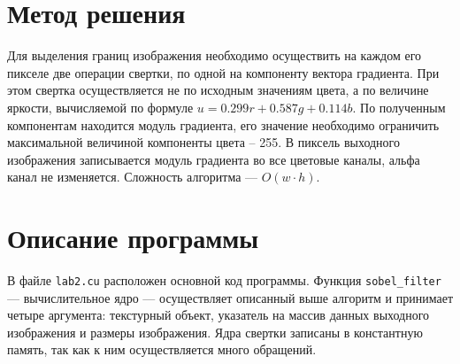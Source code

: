 \section{Метод решения}
Для выделения границ изображения необходимо осуществить на каждом его пикселе две операции свертки, по одной на компоненту вектора градиента. При этом свертка осуществляется не по исходным значениям цвета, а по величине яркости, вычисляемой по формуле $u = 0.299r +  0.587g + 0.114b$. По полученным компонентам находится модуль градиента, его значение необходимо ограничить максимальной величиной компоненты цвета -- 255. В пиксель выходного изображения записывается модуль градиента во все цветовые каналы, альфа канал не изменяется. Сложность алгоритма --- $O(w \cdot h)$.

\section{Описание программы}
В файле \texttt{lab2.cu} расположен основной код программы. Функция \texttt{sobel\_filter} --- вычислительное ядро --- осуществляет описанный выше алгоритм и принимает четыре аргумента: текстурный объект, указатель на массив данных выходного изображения и размеры изображения. Ядра свертки записаны в константную память, так как к ним осуществляется много обращений.